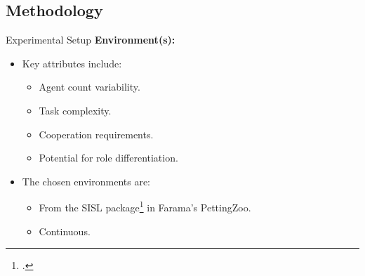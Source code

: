 \subsection{Methodology}



\begin{frame}{Experimental Setup}
    \textbf{Environment(s):}
    \begin{itemize}
        \item Key attributes include:
        \begin{itemize}
            \item Agent count variability.
            \item Task complexity.
            \item Cooperation requirements.
            \item Potential for role differentiation.
        \end{itemize}
        \item The chosen environments are:
        \begin{itemize}
            \item From the SISL package\footcite{gupta2017} in Farama's PettingZoo.
            \item Continuous.
        \end{itemize}
    \end{itemize}
\end{frame}

